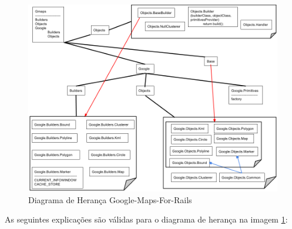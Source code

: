 \begin{figure}[ht]
  \begin{center}     
    \includegraphics[scale=0.35]{images/diagrama_de_heranca_google_maps_for_rails.png}
    \caption{Diagrama de Herança Google-Maps-For-Rails}
   \label{fig:diagrama_de_heranca_google_maps_for_rails}
  \end{center}
\end{figure}

As seguintes explicações são válidas para o diagrama de herança na imagem
\ref{fig:diagrama_de_heranca_google_maps_for_rails}:

